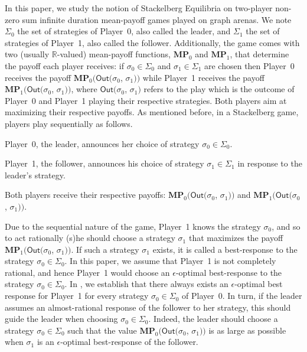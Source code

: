 In this paper, we study the notion of Stackelberg Equilibria on two-player non-zero sum infinite duration mean-payoff games played on graph arenas. We note $\Sigma_0$ the set of strategies of Player~0, also called the leader, and $\Sigma_1$ the set of strategies of Player~1, also called the follower. Additionally, the game comes with two (usually $\mathbb{R}$-valued) mean-payoff functions, $\mathbf{MP}_0$ and $\mathbf{MP}_1$, that determine the payoff each player receives: if $\sigma_0 \in \Sigma_0$ and $\sigma_1 \in \Sigma_1$ are chosen then Player~0 receives the payoff $\mathbf{MP}_0 (\mathsf{Out}(\sigma_0$, $\sigma_1))$ while Player~1 receives the payoff $\mathbf{MP}_1(\mathsf{Out}(\sigma_0$, $\sigma_1))$, where $\mathsf{Out}(\sigma_0$, $\sigma_1)$ refers to the play which is the outcome of Player~0 and Player~1 playing their respective strategies. Both players aim at maximizing their respective payoffs. As mentioned before, in a Stackelberg game, players play sequentially as follows.
\begin{inparaenum}[(i)]
\item Player~0, the leader, announces her choice of strategy $\sigma_0 \in \Sigma_0$. 
\item Player~1, the follower, announces his choice of strategy $\sigma_1 \in \Sigma_1$ in response to the leader's strategy. 
\item Both players receive their respective payoffs: $\mathbf{MP}_0 (\mathsf{Out}(\sigma_0$, $\sigma_1))$ and $\mathbf{MP}_1 (\mathsf{Out}(\sigma_0$, $\sigma_1))$.
\end{inparaenum}
Due to the sequential nature of the game, Player~1 knows the strategy $\sigma_0$, and so to act rationally (s)he should choose a strategy $\sigma_1$ that maximizes the payoff $\mathbf{MP}_1 (\mathsf{Out}(\sigma_0$, $\sigma_1))$. If such a strategy $\sigma_1$ exists, it is called a best-response to the strategy $\sigma_0 \in \Sigma_0$.
In this paper, we assume that Player~1 is not completely rational, and hence Player~1 would choose an $\epsilon$-optimal best-response to the strategy $\sigma_0 \in \Sigma_0$. In \cite{FGR20}, we establish that there always exists an $\epsilon$-optimal best response for Player~1 for every strategy $\sigma_0 \in \Sigma_0$ of Player~0.
In turn, if the leader assumes an almost-rational response of the follower to her strategy, this should guide the leader when choosing $\sigma_0 \in \Sigma_0$.
Indeed, the leader should choose a strategy $\sigma_0 \in \Sigma_0$ such that the value $\mathbf{MP}_0 (\mathsf{Out}(\sigma_0$, $\sigma_1))$ is as large as possible when $\sigma_1$ is an $\epsilon$-optimal best-response of the follower.

